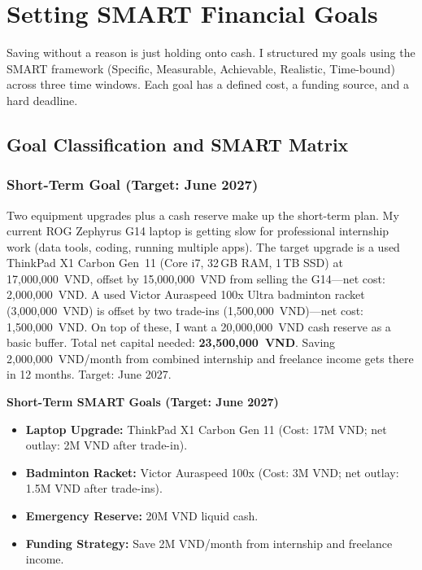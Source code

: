 \chapter{Setting SMART Financial Goals}

Saving without a reason is just holding onto cash. I structured my goals using the SMART framework (Specific, Measurable, Achievable, Realistic, Time-bound) across three time windows. Each goal has a defined cost, a funding source, and a hard deadline.

\section{Goal Classification and SMART Matrix}

\subsection{Short-Term Goal (Target: June 2027)}

Two equipment upgrades plus a cash reserve make up the short-term plan. My current ROG Zephyrus G14 laptop is getting slow for professional internship work (data tools, coding, running multiple apps). The target upgrade is a used ThinkPad X1 Carbon Gen~11 (Core i7, 32\,GB RAM, 1\,TB SSD) at 17,000,000~VND, offset by 15,000,000~VND from selling the G14---net cost: 2,000,000~VND. A used Victor Auraspeed 100x Ultra badminton racket (3,000,000~VND) is offset by two trade-ins (1,500,000~VND)---net cost: 1,500,000~VND. On top of these, I want a 20,000,000~VND cash reserve as a basic buffer. Total net capital needed: \textbf{23,500,000~VND}. Saving 2,000,000~VND/month from combined internship and freelance income gets there in 12 months. Target: June 2027.

\begin{takeawaybox}
  \textbf{Short-Term SMART Goals (Target: June 2027)}
  \begin{itemize}[leftmargin=*]
    \item \textbf{Laptop Upgrade:} ThinkPad X1 Carbon Gen 11 (Cost: 17M VND; net outlay: 2M VND after trade-in).
    \item \textbf{Badminton Racket:} Victor Auraspeed 100x (Cost: 3M VND; net outlay: 1.5M VND after trade-ins).
    \item \textbf{Emergency Reserve:} 20M VND liquid cash.
    \item \textbf{Funding Strategy:} Save 2M VND/month from internship and freelance income.
  \end{itemize}
\end{takeawaybox}


